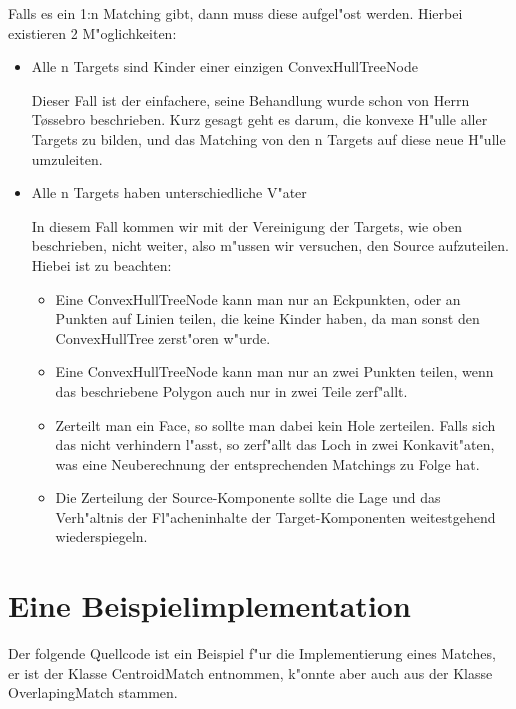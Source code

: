 \documentclass[a4paper,10pt,twoside]{scrreprt}
\begin{document}
Falls es ein 1:n Matching gibt, dann muss diese aufgel"ost werden. Hierbei existieren 2 M"oglichkeiten:
\begin{itemize}
\item Alle n Targets sind Kinder einer einzigen ConvexHullTreeNode

Dieser Fall ist der einfachere, seine Behandlung wurde schon von Herrn T\o{}ssebro beschrieben. Kurz gesagt geht es darum, die konvexe H"ulle aller Targets zu bilden, und das Matching von den n Targets auf diese neue H"ulle umzuleiten.

\item Alle n Targets haben unterschiedliche V"ater

In diesem Fall kommen wir mit der Vereinigung der Targets, wie oben beschrieben, nicht weiter, also m"ussen wir versuchen, den Source aufzuteilen. Hiebei ist zu beachten:
\begin{itemize}
\item Eine ConvexHullTreeNode kann man nur an Eckpunkten, oder an Punkten auf Linien teilen, die keine Kinder haben, da man sonst den ConvexHullTree zerst"oren w"urde.

\item Eine ConvexHullTreeNode kann man nur an zwei Punkten teilen, wenn das beschriebene Polygon auch nur in zwei Teile zerf"allt.
\nocite{KOP}
\item Zerteilt man ein Face, so sollte man dabei kein Hole zerteilen. Falls sich das nicht verhindern l"asst, so zerf"allt das Loch in zwei Konkavit"aten, was eine Neuberechnung der entsprechenden Matchings zu Folge hat.

\item Die Zerteilung der Source-Komponente sollte die Lage und das Verh"altnis der Fl"acheninhalte der Target-Komponenten weitestgehend wiederspiegeln.

\end{itemize} 
\end{itemize} 

\section{Eine Beispielimplementation}

Der folgende Quellcode ist ein Beispiel f"ur die Implementierung eines Matches, er ist der Klasse CentroidMatch entnommen, k"onnte aber auch aus der Klasse OverlapingMatch stammen. 
\end{document}
